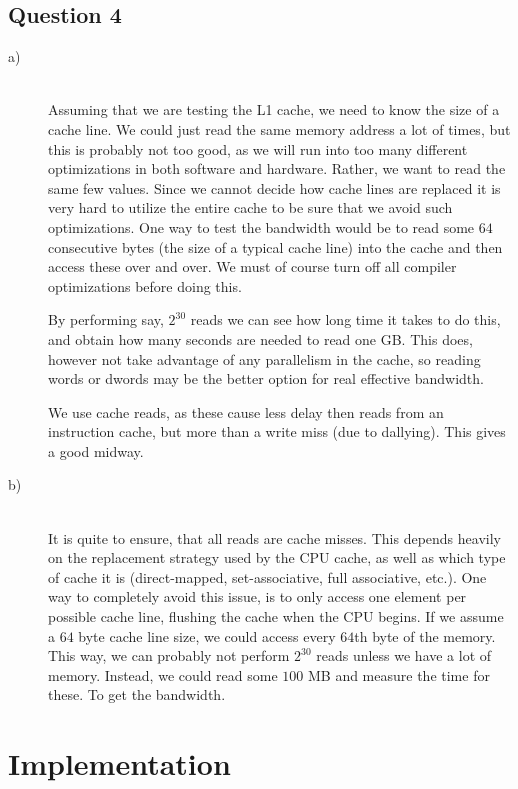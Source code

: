 \documentclass[a4paper,final]{article}
\begin{document}
\subsection*{Question 4}
\begin{description}
\item [a)]\ \\
    Assuming that we are testing the L1 cache, we need to know the size of a
    cache line. We could just read the same memory address a lot of times, but
    this is probably not too good, as we will run into too many different
    optimizations in both software and hardware. Rather, we want to read the
    same few values. Since we cannot decide how cache lines are replaced it
    is very hard to utilize the entire cache to be sure that we avoid such
    optimizations. One way to test the bandwidth would be to read some $64$
    consecutive bytes (the size of a typical cache line) into the cache and
    then access these over and over. We must of course turn off all compiler
    optimizations before doing this.

    By performing say, $2^{30}$ reads we can see how long time it takes to do
    this, and obtain how many seconds are needed to read one GB. This does,
    however not take advantage of any parallelism in the cache, so reading
    words or dwords may be the better option for real effective bandwidth.

    We use cache reads, as these cause less delay then reads from an
    instruction cache, but more than a write miss (due to dallying). This
    gives a good midway.
\item [b)]\ \\
    It is quite to ensure, that all reads are cache misses. This depends
    heavily on the replacement strategy used by the CPU cache, as well as which
    type of cache it is (direct-mapped, set-associative, full associative,
    etc.). One way to completely avoid this issue, is to only access one
    element per possible cache line, flushing the cache when the CPU begins.
    If we assume a $64$ byte cache line size, we could access every $64$th
    byte of the memory. This way, we can probably not perform $2^{30}$ reads
    unless we have a lot of memory. Instead, we could read some $100$ MB and
    measure the time for these. To get the bandwidth.
\end{description}


\section{Implementation}
\end{document}

